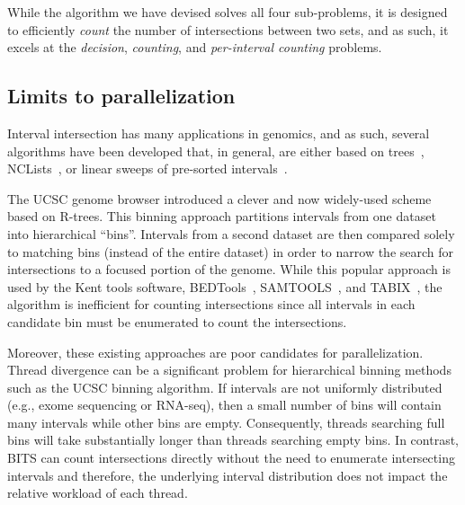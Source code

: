 \documentclass{bioinfo}
\begin{document}
While the algorithm we have devised solves all four sub-problems, it is designed
to efficiently \emph{count} the number of intersections between two sets, and as
such, it excels at the \emph{decision}, \emph{counting}, and
\emph{per-interval counting} problems.


\subsection{Limits to parallelization}

Interval intersection has many applications in genomics, and as such, several
algorithms have been developed that, in general, are either based on
trees~\citep{kent2002}, NCLists~\citep{alekseyenko2007}, or linear sweeps of
pre-sorted intervals~\citep{richardson2006}.

The UCSC genome browser introduced a clever and now widely-used scheme based on
R-trees. This binning approach partitions intervals from one dataset into
hierarchical ``bins''.  Intervals from a second dataset are then compared solely
to matching bins (instead of the entire dataset) in order to narrow the search
for intersections to a focused portion of the genome.  While this popular
approach is used by the Kent tools software, BEDTools~\citep{quinlan2010},
SAMTOOLS~\citep{li2009}, and TABIX~\citep{li2011}, the algorithm is inefficient
for counting intersections since all intervals in each candidate bin must be
enumerated to count the intersections.

Moreover, these existing approaches are poor candidates for parallelization.
Thread divergence can be a significant problem for hierarchical binning methods
such as the UCSC binning algorithm.  If intervals are not uniformly distributed
(e.g., exome sequencing or RNA-seq), then a small number of bins will contain
many intervals while other bins are empty. Consequently, threads searching full
bins will take substantially longer than threads searching empty bins.  In
contrast, BITS can count intersections directly without the need to enumerate
intersecting intervals and therefore, the underlying interval distribution does
not impact the relative workload of each thread.

\end{document}
